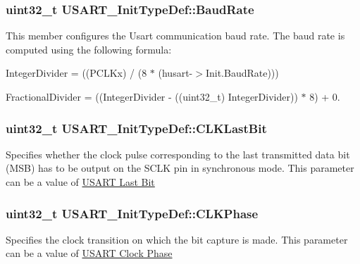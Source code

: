 \subsubsection[{\texorpdfstring{Baud\+Rate}{BaudRate}}]{\setlength{\rightskip}{0pt plus 5cm}uint32\+\_\+t U\+S\+A\+R\+T\+\_\+\+Init\+Type\+Def\+::\+Baud\+Rate}\hypertarget{struct_u_s_a_r_t___init_type_def_adef2ac12c9e2091ba9f511718b30ae50}{}\label{struct_u_s_a_r_t___init_type_def_adef2ac12c9e2091ba9f511718b30ae50}
This member configures the Usart communication baud rate. The baud rate is computed using the following formula\+:
\begin{DoxyItemize}
\item Integer\+Divider = ((P\+C\+L\+Kx) / (8 $\ast$ (husart-\/$>$Init.\+Baud\+Rate)))
\item Fractional\+Divider = ((Integer\+Divider -\/ ((uint32\+\_\+t) Integer\+Divider)) $\ast$ 8) + 0. 
\end{DoxyItemize}
\subsubsection[{\texorpdfstring{C\+L\+K\+Last\+Bit}{CLKLastBit}}]{\setlength{\rightskip}{0pt plus 5cm}uint32\+\_\+t U\+S\+A\+R\+T\+\_\+\+Init\+Type\+Def\+::\+C\+L\+K\+Last\+Bit}\hypertarget{struct_u_s_a_r_t___init_type_def_a86c0426bafc6c8e67279cbff72ebbe00}{}\label{struct_u_s_a_r_t___init_type_def_a86c0426bafc6c8e67279cbff72ebbe00}
Specifies whether the clock pulse corresponding to the last transmitted data bit (M\+SB) has to be output on the S\+C\+LK pin in synchronous mode. This parameter can be a value of \hyperlink{group___u_s_a_r_t___last___bit}{U\+S\+A\+RT Last Bit} 
\subsubsection[{\texorpdfstring{C\+L\+K\+Phase}{CLKPhase}}]{\setlength{\rightskip}{0pt plus 5cm}uint32\+\_\+t U\+S\+A\+R\+T\+\_\+\+Init\+Type\+Def\+::\+C\+L\+K\+Phase}\hypertarget{struct_u_s_a_r_t___init_type_def_ac596050ef100502529e0b78696ffbdc1}{}\label{struct_u_s_a_r_t___init_type_def_ac596050ef100502529e0b78696ffbdc1}
Specifies the clock transition on which the bit capture is made. This parameter can be a value of \hyperlink{group___u_s_a_r_t___clock___phase}{U\+S\+A\+RT Clock Phase} 
